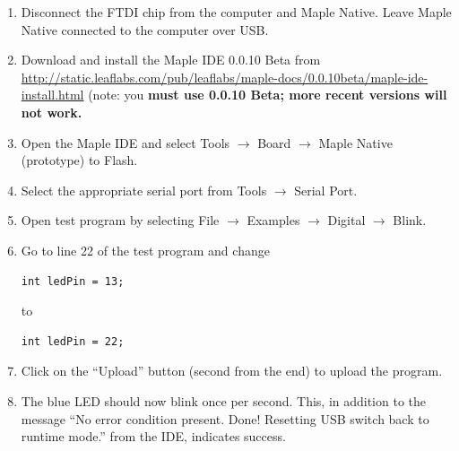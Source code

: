 \documentclass[a4paper,12pt]{report}
\begin{document}
\begin{enumerate}
\item Disconnect the FTDI chip from the computer and Maple Native. Leave Maple Native connected to the computer over USB.
\item Download and install the Maple IDE 0.0.10 Beta from \url{http://static.leaflabs.com/pub/leaflabs/maple-docs/0.0.10beta/maple-ide-install.html} (note: you \bf must \rm use 0.0.10 Beta; more recent versions will not work.
\item Open the Maple IDE and select Tools $\to$ Board $\to$ Maple Native (prototype) to Flash.
\item Select the appropriate serial port from Tools $\to$ Serial Port.
\item Open test program by selecting File $\to$ Examples $\to$ Digital $\to$ Blink.
\item Go to line 22 of the test program and change \begin{verbatim}int ledPin = 13;\end{verbatim} to\begin{verbatim}int ledPin = 22;\end{verbatim}
\item Click on the ``Upload'' button (second from the end) to upload the program.
\item The blue LED should now blink once per second. This, in addition to the message ``No error condition present. Done! Resetting USB switch back to runtime mode.'' from the IDE, indicates success.
\end{enumerate}
\end{document}
